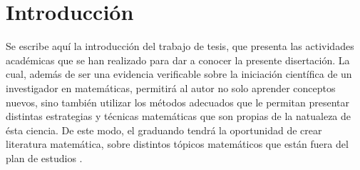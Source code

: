 \chapter*{Introducci\'on}
\pagestyle{plain}
\setcounter{page}{1}

Se escribe aqu\'i la introducci\'on del trabajo de tesis,
que presenta las actividades acad\'emicas que se han realizado para
dar a conocer la presente disertaci\'on.
La cual, adem\'as de ser una evidencia verificable sobre la iniciaci\'on
cient\'ifica de un investigador en matem\'aticas,
permitir\'a al autor no solo aprender conceptos nuevos,
sino tambi\'en utilizar los m\'etodos adecuados que le permitan presentar
distintas estrategias y t\'ecnicas matem\'aticas que son propias de la
natualeza de \'esta ciencia.
De este modo, el graduando tendr\'a la oportunidad de crear
literatura matem\'atica, sobre distintos t\'opicos matem\'aticos
que est\'an fuera del plan de estudios \cite{Knuth1976}.
